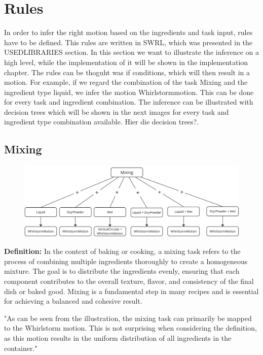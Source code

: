 \section*{Rules}
In order to infer the right motion based on the ingredients and task input, rules have to be defined. This rules are written in SWRL, which was presented in the USEDLIBRARIES section. In this section we want to illustrate the inference on a high level, while the implementation of it will be shown in the implementation chapter. 
The rules can be thoguht was if conditions, which will then result in a motion. For example, if we regard the combination of the task Mixing and the ingredient type liquid, we infer the motion Whirlstormmotion. This can be done for every task and ingredient combination. 
The inference can be illustrated with decision trees which will be shown in the next images for every task and ingredient type combination available. 
Hier die decision trees?.

\subsection*{Mixing}
\begin{figure}[H]
\includegraphics[scale=0.18]{Graphics/MixingDecisionTree.jpg}
\end{figure}
\textbf{Definition:} In the context of baking or cooking, a mixing task refers to the process of combining multiple ingredients thoroughly to create a homogeneous mixture. The goal is to distribute the ingredients evenly, ensuring that each component contributes to the overall texture, flavor, and consistency of the final dish or baked good. Mixing is a fundamental step in many recipes and is essential for achieving a balanced and cohesive result.


"As can be seen from the illustration, the mixing task can primarily be mapped to the Whirlstorm motion. This is not surprising when considering the definition, as this motion results in the uniform distribution of all ingredients in the container."
